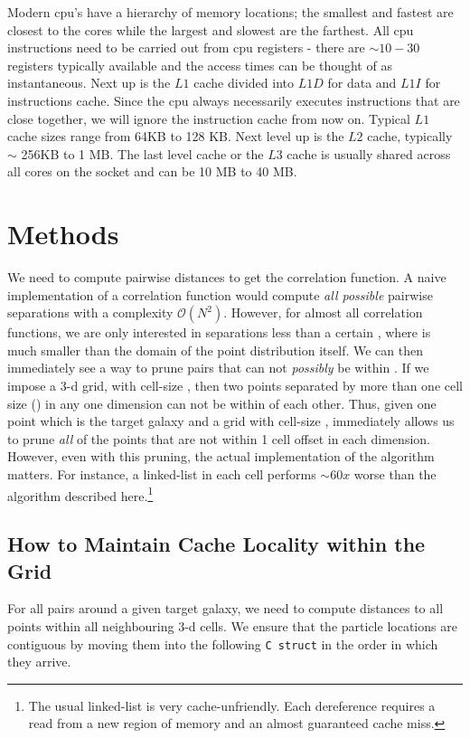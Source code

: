 \documentclass[apj]{emulateapj}
\begin{document}
Modern cpu's have a hierarchy of memory locations; the smallest and fastest are closest to the cores while the largest and slowest are the
farthest. All cpu instructions need to be carried out from cpu registers - there are $\sim 10-30$ registers typically available and the 
access times can be thought of as instantaneous. Next up is the $L1$ cache divided into $L1D$ for data and $L1I$ for instructions cache. Since 
the cpu always necessarily executes instructions that are close together, we will ignore the instruction cache from now on. Typical $L1$ cache 
sizes range from 64KB to 128 KB. Next level up is the $L2$ cache, typically $\sim$ 256KB to 1 MB. The last level cache or the $L3$ cache 
is usually shared across all cores on the socket and can be 10 MB to 40 MB. 


\section{Methods}
We need to compute pairwise distances to get the correlation function. A naive implementation of a correlation function would compute {\em all possible} 
pairwise separations with a complexity $\mathcal{O}(N^2)$. However, for almost all correlation functions, we are only interested in separations less than 
a certain \rmax, where \rmax is much smaller than the domain of the point distribution itself. We can then immediately see a way to prune pairs that can not
{\em possibly} be within \rmax. If we impose a 3-d grid, with cell-size \rmax, then two points separated by more than one cell size (\rmax) in any one 
dimension can not be within \rmax of each other. Thus, given one point which is the target galaxy and a grid with cell-size \rmax, 
immediately allows us to prune {\em all} of the points that are not within 1 cell offset in each dimension. However, even with this pruning, the actual 
implementation of the algorithm matters. For instance, a linked-list in each cell performs $\sim 60x$ worse than the algorithm described here.\footnote{The 
usual linked-list is very cache-unfriendly. Each dereference requires a read from a new region of memory and an almost guaranteed cache miss. } 

\subsection{How to Maintain Cache Locality within the Grid}
For all pairs around a given target galaxy, we need to compute distances to all points within all neighbouring 3-d cells. 
We ensure that the particle locations are contiguous by moving them into the following \texttt{C struct} in the order in which they arrive. 
\end{document}
